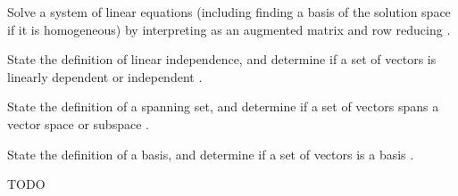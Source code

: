 \documentclass{article}[12pt]
\begin{document}
\begin{readinessAssuranceOutcomes}
\item Solve a system of linear equations (including finding a basis of the solution space if it is homogeneous) by interpreting as an augmented matrix and row reducing .
\item State the definition of linear independence, and determine if a set of vectors is linearly dependent or independent .
\item State the definition of a spanning set, and determine if a set of vectors spans a vector space or subspace .
\item State the definition of a basis, and determine if a set of vectors is a basis .
\end{readinessAssuranceOutcomes}

\begin{readinessAssuranceResources}
\item TODO
\end{readinessAssuranceResources}
\end{document}
